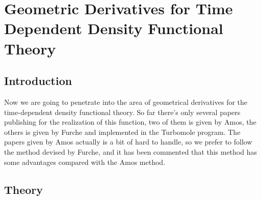 %
%
%
%
%
%
%
\chapter{Geometric Derivatives for Time Dependent
Density Functional Theory}
%
%
%
\section{Introduction}
%
%
%
Now we are going to penetrate into the area of geometrical
derivatives for the time-dependent density functional theory. So far
there's only several papers publishing for the realization of this
function, two of them is given by Amos\cite{VanCaillie2000159,
VanCaillie1999249}, the others is given by Furche\cite{furche:7433,
rappoport:064105} and implemented in the Turbomole
program\cite{turbomole}. The papers given by Amos actually is a bit
of hard to handle, so we prefer to follow the method devised by
Furche, and it has been commented that this method has some
advantages compared with the Amos method\cite{chiba:144106}.



\section{Theory}
%
%
